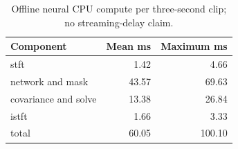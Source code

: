 \begin{table}[htbp]\centering\small
\caption{Offline neural CPU compute per three-second clip; no streaming-delay claim.}
\begin{tabular}{lrr}\toprule
Component & Mean ms & Maximum ms \\
\midrule
stft & 1.42 & 4.66 \\
network and mask & 43.57 & 69.63 \\
covariance and solve & 13.38 & 26.84 \\
istft & 1.66 & 3.33 \\
total & 60.05 & 100.10 \\
\bottomrule\end{tabular}\end{table}

